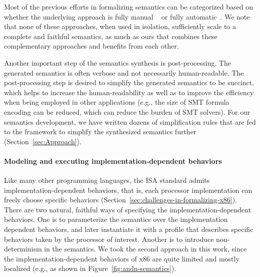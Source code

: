 {%
%
%

Most of the previous efforts in formalizing \ISA semantics can be categorized based on whether the underlying approach is fully manual ~\cite{Goel:FMCAD14, TSL:TOPLAS13, Leroy:2009, sail-x86} or fully automatic~\cite{Heule2016a, Roessle:CPP19, Hasabnis:ASPLOS16, Hasabnis:FSE16}. We note that none of these approaches, when used in isolation, sufficiently scale to a complete and faithful semantics, as much as ours that combines these complementary approaches and benefits from each other.

Another important step of the semantics synthesis is post-processing. The generated semantics is often verbose and not necessarily human-readable. The post-processing step is desired to simplify the generated semantics to be succinct, which helps to increase the human-readability as well as to improve the efficiency when being employed in other applications (e.g., the size of SMT formula encoding can be reduced, which can reduce the burden of SMT solvers). For our semantics development, we have written dozens of simplification rules that are fed to the \K framework to simplify the synthesized semantics further (Section~\ref{sec:Approach}). 

\paragraph{Modeling and executing implementation-dependent behaviors}

Like many other programming languages, the \ISA ISA standard admits implementation-dependent behaviors, that is, each processor implementation can freely choose specific behaviors (Section~\ref{sec:challenges-in-formalizing-x86}).
There are two natural, faithful ways of specifying the implementation-dependent behaviors.
One is to parameterize the semantics over the implementation dependent behaviors, and later instantiate it with a profile that describes specific behaviors taken by the processor of interest.
Another is to introduce non-determinism in the semantics.
We took the second approach in this work, since the implementation-dependent behaviors of x86 are quite limited and mostly localized (e.g., as shown in Figure~\ref{fig:andn-semantics}).

}
